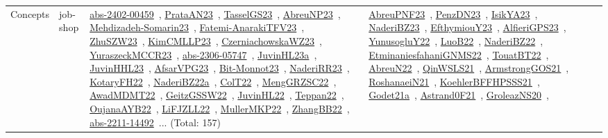 {\begin{longtable}{lp{3cm}>{\raggedright\arraybackslash}p{6cm}>{\raggedright\arraybackslash}p{6cm}>{\raggedright\arraybackslash}p{8cm}}
Concepts & job-shop & \href{../works/abs-2402-00459.pdf}{abs-2402-00459}~\cite{abs-2402-00459}, \href{../works/PrataAN23.pdf}{PrataAN23}~\cite{PrataAN23}, \href{../works/TasselGS23.pdf}{TasselGS23}~\cite{TasselGS23}, \href{../works/AbreuNP23.pdf}{AbreuNP23}~\cite{AbreuNP23}, \href{../works/Mehdizadeh-Somarin23.pdf}{Mehdizadeh-Somarin23}~\cite{Mehdizadeh-Somarin23}, \href{../works/Fatemi-AnarakiTFV23.pdf}{Fatemi-AnarakiTFV23}~\cite{Fatemi-AnarakiTFV23}, \href{../works/ZhuSZW23.pdf}{ZhuSZW23}~\cite{ZhuSZW23}, \href{../works/KimCMLLP23.pdf}{KimCMLLP23}~\cite{KimCMLLP23}, \href{../works/CzerniachowskaWZ23.pdf}{CzerniachowskaWZ23}~\cite{CzerniachowskaWZ23}, \href{../works/YuraszeckMCCR23.pdf}{YuraszeckMCCR23}~\cite{YuraszeckMCCR23}, \href{../works/abs-2306-05747.pdf}{abs-2306-05747}~\cite{abs-2306-05747}, \href{../works/JuvinHL23a.pdf}{JuvinHL23a}~\cite{JuvinHL23a}, \href{../works/JuvinHHL23.pdf}{JuvinHHL23}~\cite{JuvinHHL23}, \href{../works/AfsarVPG23.pdf}{AfsarVPG23}~\cite{AfsarVPG23}, \href{../works/Bit-Monnot23.pdf}{Bit-Monnot23}~\cite{Bit-Monnot23}, \href{../works/NaderiRR23.pdf}{NaderiRR23}~\cite{NaderiRR23}, \href{../works/KotaryFH22.pdf}{KotaryFH22}~\cite{KotaryFH22}, \href{../works/NaderiBZ22a.pdf}{NaderiBZ22a}~\cite{NaderiBZ22a}, \href{../works/ColT22.pdf}{ColT22}~\cite{ColT22}, \href{../works/MengGRZSC22.pdf}{MengGRZSC22}~\cite{MengGRZSC22}, \href{../works/AwadMDMT22.pdf}{AwadMDMT22}~\cite{AwadMDMT22}, \href{../works/GeitzGSSW22.pdf}{GeitzGSSW22}~\cite{GeitzGSSW22}, \href{../works/JuvinHL22.pdf}{JuvinHL22}~\cite{JuvinHL22}, \href{../works/Teppan22.pdf}{Teppan22}~\cite{Teppan22}, \href{../works/OujanaAYB22.pdf}{OujanaAYB22}~\cite{OujanaAYB22}, \href{../works/LiFJZLL22.pdf}{LiFJZLL22}~\cite{LiFJZLL22}, \href{../works/MullerMKP22.pdf}{MullerMKP22}~\cite{MullerMKP22}, \href{../works/ZhangBB22.pdf}{ZhangBB22}~\cite{ZhangBB22}, \href{../works/abs-2211-14492.pdf}{abs-2211-14492}~\cite{abs-2211-14492}... (Total: 157) & \href{../works/AbreuPNF23.pdf}{AbreuPNF23}~\cite{AbreuPNF23}, \href{../works/PenzDN23.pdf}{PenzDN23}~\cite{PenzDN23}, \href{../works/IsikYA23.pdf}{IsikYA23}~\cite{IsikYA23}, \href{../works/NaderiBZ23.pdf}{NaderiBZ23}~\cite{NaderiBZ23}, \href{../works/EfthymiouY23.pdf}{EfthymiouY23}~\cite{EfthymiouY23}, \href{../works/AlfieriGPS23.pdf}{AlfieriGPS23}~\cite{AlfieriGPS23}, \href{../works/YunusogluY22.pdf}{YunusogluY22}~\cite{YunusogluY22}, \href{../works/LuoB22.pdf}{LuoB22}~\cite{LuoB22}, \href{../works/NaderiBZ22.pdf}{NaderiBZ22}~\cite{NaderiBZ22}, \href{../works/EtminaniesfahaniGNMS22.pdf}{EtminaniesfahaniGNMS22}~\cite{EtminaniesfahaniGNMS22}, \href{../works/TouatBT22.pdf}{TouatBT22}~\cite{TouatBT22}, \href{../works/AbreuN22.pdf}{AbreuN22}~\cite{AbreuN22}, \href{../works/QinWSLS21.pdf}{QinWSLS21}~\cite{QinWSLS21}, \href{../works/ArmstrongGOS21.pdf}{ArmstrongGOS21}~\cite{ArmstrongGOS21}, \href{../works/RoshanaeiN21.pdf}{RoshanaeiN21}~\cite{RoshanaeiN21}, \href{../works/KoehlerBFFHPSSS21.pdf}{KoehlerBFFHPSSS21}~\cite{KoehlerBFFHPSSS21}, \href{../works/Godet21a.pdf}{Godet21a}~\cite{Godet21a}, \href{../works/Astrand0F21.pdf}{Astrand0F21}~\cite{Astrand0F21}, \href{../works/GroleazNS20.pdf}{GroleazNS20}~\cite{GroleazNS20}, 
\end{longtable}}
